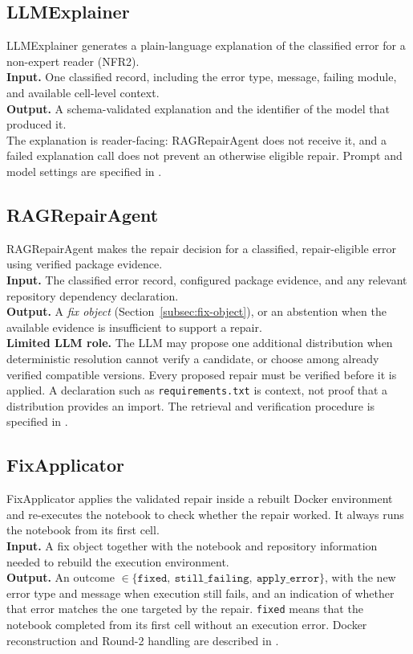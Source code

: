 \subsection{LLMExplainer}
\label{subsec:llmexplainer}
LLMExplainer generates a plain-language explanation of the classified
error for a non-expert reader (NFR2).\\
\textbf{Input.} One classified record, including the error type, message,
failing module, and available cell-level context.\\
\textbf{Output.} A schema-validated explanation and the identifier of the
model that produced it.\\
The explanation is reader-facing: RAGRepairAgent does not receive it, and a
failed explanation call does not prevent an otherwise eligible repair. Prompt
and model settings are specified in .

\subsection{RAGRepairAgent}
\label{subsec:repairagent}
RAGRepairAgent makes the repair decision for a classified, repair-eligible
error using verified package evidence.\\
\textbf{Input.} The classified error record, configured package evidence, and
any relevant repository dependency declaration.\\
\textbf{Output.} A \emph{fix object} (Section~\ref{subsec:fix-object}), or
an abstention when the available evidence is insufficient to support a
repair.\\
\textbf{Limited LLM role.} The LLM may propose one additional distribution
when deterministic resolution cannot verify a candidate, or choose among
already verified compatible versions. Every proposed repair must be verified
before it is applied. A declaration such as \texttt{requirements.txt} is
context, not proof that a distribution provides an import. The retrieval and
verification procedure is specified in .

\subsection{FixApplicator}
\label{subsec:fixapplicator}
FixApplicator applies the validated repair inside a rebuilt Docker
environment and re-executes the notebook to check whether the repair
worked. It always runs the notebook from its first cell.\\
\textbf{Input.} A fix object together with the notebook and repository
information needed to rebuild the execution environment.\\
\textbf{Output.} An outcome
$\in \{\texttt{fixed},\ \texttt{still\_failing},\ \texttt{apply\_error}\}$,
with the new error type and message when execution still fails, and an
indication of whether that error matches the one targeted by the repair.
\texttt{fixed} means that the notebook completed from its first cell without
an execution error. Docker reconstruction and Round-2 handling are described
in .

